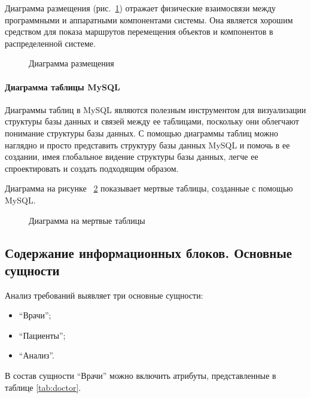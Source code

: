 Диаграмма размещения (рис.~\ref{place:image}) отражает физические взаимосвязи между программными и аппаратными компонентами системы. Она является хорошим средством для показа маршрутов перемещения объектов и компонентов в распределенной системе.

\begin{figure}[H]
\caption{Диаграмма размещения}
\label{place:image}
\end{figure}

\paragraph{Диаграмма таблицы MySQL}

Диаграммы таблиц в MySQL являются полезным инструментом для визуализации структуры базы данных и связей между ее таблицами, поскольку они облегчают понимание структуры базы данных. С помощью диаграммы таблиц можно наглядно и просто представить структуру базы данных MySQL и помочь в ее создании, имея глобальное видение структуры базы данных, легче ее спроектировать и создать подходящим образом.

Диаграмма на рисунке ~\ref{image:bas} показывает мертвые таблицы, созданные с помощью MySQL.

\begin{figure}[H]
	\caption{Диаграмма на мертвые таблицы}
	\label{image:bas}
\end{figure}

\subsection{Содержание информационных блоков. Основные сущности}

Анализ требований выявляет три основные сущности:
\begin{itemize}
\item ``Врачи'';
\item ``Пациенты'';
\item ``Анализ''.
\end{itemize}

В состав сущности ``Врачи'' можно включить атрибуты, представленные в таблице \ref{tab:doctor}.

